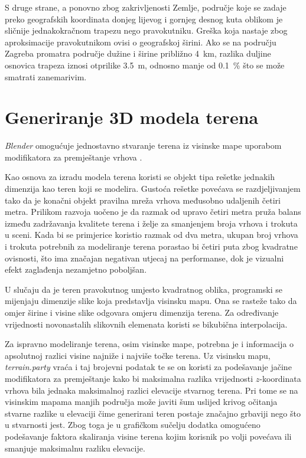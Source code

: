 \documentclass[times, utf8, zavrsni, numeric]{fer}
\begin{document}
		S druge strane, a ponovno zbog zakrivljenosti Zemlje, područje koje se zadaje preko geografskih koordinata donjeg lijevog i gornjeg desnog kuta oblikom je sličnije jednakokračnom trapezu nego pravokutniku.
		Greška koja nastaje zbog aproksimacije pravokutnikom ovisi o geografskoj širini.
		Ako se na području Zagreba promatra područje dužine i širine približno \SI{4}{\kilo\meter}, razlika duljine osnovica trapeza iznosi otprilike \SI{3.5}{\meter}, odnosno manje od \SI{0.1}{\percent} što se može smatrati zanemarivim.
	
	
	
	\section{Generiranje 3D modela terena}
	
		\textit{Blender} omogućuje jednostavno stvaranje terena iz visinske mape uporabom modifikatora za premještanje vrhova .
		
		Kao osnova za izradu modela terena koristi se objekt tipa rešetke  jednakih dimenzija kao teren koji se modelira.
		Gustoća rešetke povećava se razdjeljivanjem  tako da je konačni objekt pravilna mreža vrhova međusobno udaljenih četiri metra.
		Prilikom razvoja uočeno je da razmak od upravo četiri metra pruža balans između zadržavanja kvalitete terena i želje za smanjenjem broja vrhova i trokuta u sceni.
		Kada bi se primjerice koristio razmak od dva metra, ukupan broj vrhova i trokuta potrebnih za modeliranje terena porastao bi četiri puta zbog kvadratne ovisnosti, što ima značajan negativan utjecaj na performanse, dok je vizualni efekt zaglađenja nezamjetno poboljšan.
		
		U slučaju da je teren pravokutnog umjesto kvadratnog oblika, programski se mijenjaju dimenzije slike koja predstavlja visinsku mapu.
		Ona se rasteže tako da omjer širine i visine slike odgovara omjeru dimenzija terena.
		Za određivanje vrijednosti novonastalih slikovnih elemenata koristi se bikubična interpolacija.
		
		Za ispravno modeliranje terena, osim visinske mape, potrebna je i informacija o apsolutnoj razlici visine najniže i najviše točke terena.
		Uz visinsku mapu, \textit{terrain.party} vraća i taj brojevni podatak te se on koristi za podešavanje jačine  modifikatora za premještanje kako bi maksimalna razlika vrijednosti $z$-koordinata vrhova bila jednaka maksimalnoj razlici elevacije stvarnog terena.
		Pri tome se na visinskim mapama manjih područja može javiti šum uslijed krivog očitanja stvarne razlike u elevaciji čime generirani teren postaje značajno grbaviji nego što u stvarnosti jest.
		Zbog toga je u grafičkom sučelju dodatka omogućeno podešavanje faktora skaliranja visine terena kojim korisnik po volji povećava ili smanjuje maksimalnu razliku elevacije.
		
\end{document}
